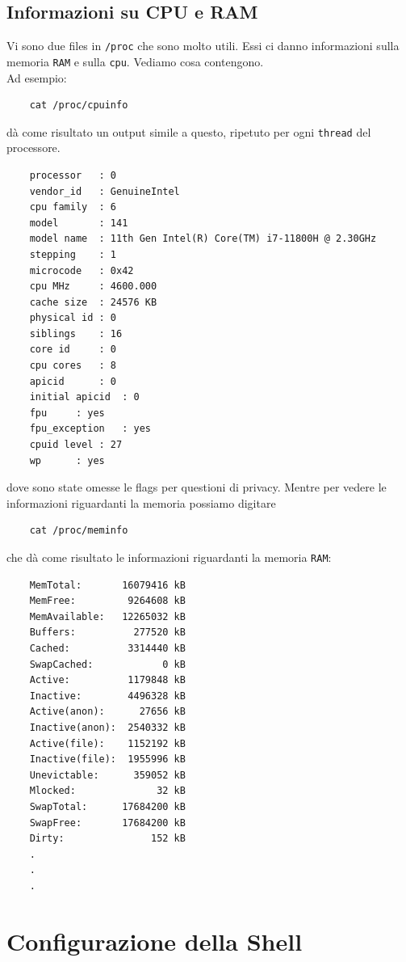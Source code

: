 \subsection{Informazioni su CPU e RAM}
Vi sono due files in \verb*|/proc| che sono molto utili. Essi ci danno informazioni sulla memoria \verb*|RAM| e sulla \verb*|cpu|. Vediamo cosa contengono.\\
 Ad esempio:
\begin{verbatim}
	cat /proc/cpuinfo
\end{verbatim}
dà come risultato un output simile a questo, ripetuto per ogni \verb*|thread| del processore. 
\begin{verbatim}
	processor	: 0
	vendor_id	: GenuineIntel
	cpu family	: 6
	model		: 141
	model name	: 11th Gen Intel(R) Core(TM) i7-11800H @ 2.30GHz
	stepping	: 1
	microcode	: 0x42
	cpu MHz		: 4600.000
	cache size	: 24576 KB
	physical id	: 0
	siblings	: 16
	core id		: 0
	cpu cores	: 8
	apicid		: 0
	initial apicid	: 0
	fpu		: yes
	fpu_exception	: yes
	cpuid level	: 27
	wp		: yes
\end{verbatim}
dove sono state omesse le flags per questioni di privacy. Mentre per vedere le informazioni riguardanti la memoria possiamo digitare
\begin{verbatim}
	cat /proc/meminfo
\end{verbatim}
che dà come risultato le informazioni riguardanti la memoria \verb*|RAM|:
\begin{verbatim}
	MemTotal:       16079416 kB
	MemFree:         9264608 kB
	MemAvailable:   12265032 kB
	Buffers:          277520 kB
	Cached:          3314440 kB
	SwapCached:            0 kB
	Active:          1179848 kB
	Inactive:        4496328 kB
	Active(anon):      27656 kB
	Inactive(anon):  2540332 kB
	Active(file):    1152192 kB
	Inactive(file):  1955996 kB
	Unevictable:      359052 kB
	Mlocked:              32 kB
	SwapTotal:      17684200 kB
	SwapFree:       17684200 kB
	Dirty:               152 kB
	.
	.
	.
\end{verbatim}

\section{Configurazione della Shell}
